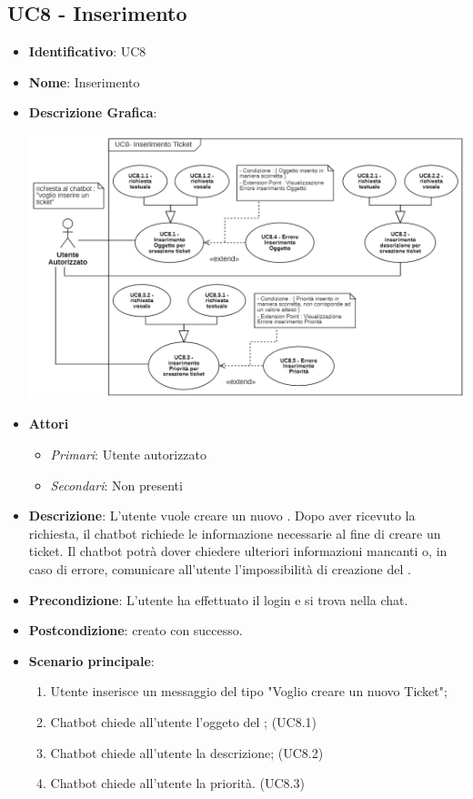 \subsection{UC8 - Inserimento }
\begin{itemize}
	\item \textbf{Identificativo}: UC8
	\item \textbf{Nome}: Inserimento 
	\item\textbf{Descrizione Grafica}: 
	\begin{center}
		\includegraphics[scale=0.65]{images/UC8.png} 
	\end{center}

	\item \textbf{Attori}
	\begin{itemize} 
		\item \textit{Primari}: Utente autorizzato
		\item \textit{Secondari}: Non presenti 
	\end{itemize}
	\item \textbf{Descrizione}: L'utente vuole creare un nuovo . Dopo aver ricevuto la richiesta, il chatbot richiede le informazione necessarie al fine di creare un ticket. Il chatbot potrà dover chiedere ulteriori informazioni mancanti o, in caso di errore, comunicare all'utente l'impossibilità di creazione del .
	\item \textbf{Precondizione}: L'utente ha effettuato il login e si trova nella chat.
	\item \textbf{Postcondizione}:  creato con successo.
	\item \textbf{Scenario principale}: \begin{enumerate}
		\item Utente inserisce un messaggio del tipo "Voglio creare un nuovo Ticket";
		\item Chatbot chiede all'utente l'oggeto del ; (UC8.1)
    \item Chatbot chiede all'utente la descrizione; (UC8.2)
		\item Chatbot chiede all'utente la priorità. (UC8.3)
	\end{enumerate}
\end{itemize}



